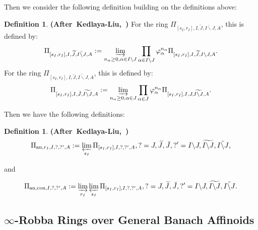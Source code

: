 \documentclass[12pt]{amsart}
\theoremstyle{definition}
\newtheorem{definition}[theorem]{Definition}
\numberwithin{equation}{section}
\begin{document}
\indent Then we consider the following definition building on the definitions above:


\begin{definition}\mbox{\bf{(After Kedlaya-Liu, \cite[Definition 5.2.1]{KL2})}}
For the ring $\Pi_{[s_I,r_I],I,\widetilde{J},\breve{I\backslash J},A}$, this is defined by:
\begin{align}
\Pi_{[s_I,r_I],I,\widetilde{J},\breve{I\backslash J},A}:=\varinjlim_{n_\alpha\geq 0,\alpha  \in I\backslash J}\prod_{\alpha\in I\backslash J}\varphi_\alpha^{n_\alpha}\Pi_{[s_I,r_I],I,\widetilde{J},I\backslash J,A}.
\end{align}
For the ring $\Pi_{[s_I,r_I],I,\breve{J},\widetilde{I\backslash J},A}$, this is defined by:
\begin{align}
\Pi_{[s_I,r_I],I,\breve{J},\widetilde{I\backslash J},A}:=\varinjlim_{n_\alpha\geq 0,\alpha  \in J}\prod_{\alpha\in J}\varphi_\alpha^{n_\alpha}\Pi_{[s_I,r_I],I,{J},\widetilde{I\backslash J},A}.
\end{align}

  
\end{definition}





\indent Then we have the following definitions:

\begin{definition} \mbox{\bf{(After Kedlaya-Liu, \cite[Definition 5.2.1]{KL2})}}
\begin{align}
\Pi_{\mathrm{an},r_I,I,?,?',A}:=\varprojlim_{s_I}\Pi_{[s_I,r_I],I,?,?',A},?=J,\widetilde{J},\breve{J},?'=I\backslash J,\widetilde{I\backslash J},\breve{I\backslash J},\\	
\end{align}

and 

\begin{align}
\Pi_{\mathrm{an},\mathrm{con},I,?,?',A}:=\varinjlim_{r_I}\varprojlim_{s_I}\Pi_{[s_I,r_I],I,?,?',A},?=J,\widetilde{J},\breve{J},?'=I\backslash J,\widetilde{I\backslash J},\breve{I\backslash J}.\\	
\end{align}	
\end{definition}


\subsection{$\infty$-Robba Rings over General Banach Affinoids}
\end{document}
